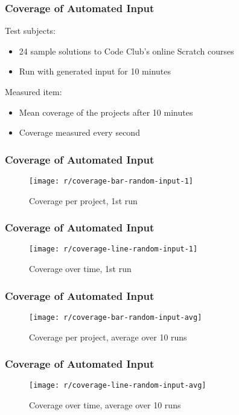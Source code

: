 \begin{frame}\frametitle{Coverage of Automated Input}
    Test subjects:
    \begin{itemize}
        \item 24 sample solutions to Code Club's online Scratch courses
        \item Run with generated input for 10 minutes
    \end{itemize}

    \bigskip

    Measured item:
    \begin{itemize}
        \item Mean coverage of the projects after 10 minutes
        \item Coverage measured every second
    \end{itemize}
\end{frame}

\begin{frame}\frametitle{Coverage of Automated Input}
    \begin{figure}
        \texttt{[image: r/coverage-bar-random-input-1]}
        \caption{Coverage per project, 1st run}
    \end{figure}
\end{frame}

\begin{frame}\frametitle{Coverage of Automated Input}
    \begin{figure}
        \texttt{[image: r/coverage-line-random-input-1]}
        \caption{Coverage over time, 1st run}
    \end{figure}
\end{frame}

\begin{frame}\frametitle{Coverage of Automated Input}
    \begin{figure}
        \texttt{[image: r/coverage-bar-random-input-avg]}
        \caption{Coverage per project, average over 10 runs}
    \end{figure}
\end{frame}

\begin{frame}\frametitle{Coverage of Automated Input}
    \begin{figure}
        \texttt{[image: r/coverage-line-random-input-avg]}
        \caption{Coverage over time, average over 10 runs}
    \end{figure}
\end{frame}
